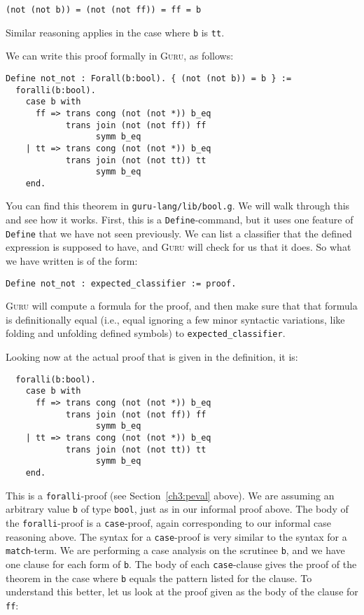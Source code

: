 \documentclass{book}[12pt]
\newcommand{\guru}[0]{\textsc{Guru}\xspace}
\begin{document}
\begin{verbatim}
(not (not b)) = (not (not ff)) = ff = b
\end{verbatim}

\noindent Similar reasoning applies in the case where \texttt{b} is
\texttt{tt}.

We can write this proof formally in \guru, as follows:

\begin{verbatim}
Define not_not : Forall(b:bool). { (not (not b)) = b } :=
  foralli(b:bool).
    case b with
      ff => trans cong (not (not *)) b_eq
            trans join (not (not ff)) ff
                  symm b_eq
    | tt => trans cong (not (not *)) b_eq
            trans join (not (not tt)) tt
                  symm b_eq           
    end.
\end{verbatim}

\noindent You can find this theorem in \texttt{guru-lang/lib/bool.g}.
We will walk through this and see how it works.  First, this is a
\texttt{Define}-command, but it uses one feature of \texttt{Define}
that we have not seen previously.  We can list a classifier that the
defined expression is supposed to have, and \guru will check for us
that it does.  So what we have written is of the form:

\begin{verbatim}
Define not_not : expected_classifier := proof.
\end{verbatim}

\noindent \guru will compute a formula for the proof, and then make
sure that that formula is definitionally equal (i.e., equal ignoring a
few minor syntactic variations, like folding and unfolding defined
symbols) to \texttt{expected\_classifier}.

Looking now at the actual proof that is given in the definition, it
is:

\begin{verbatim}
  foralli(b:bool).
    case b with
      ff => trans cong (not (not *)) b_eq
            trans join (not (not ff)) ff
                  symm b_eq
    | tt => trans cong (not (not *)) b_eq
            trans join (not (not tt)) tt
                  symm b_eq           
    end.
\end{verbatim}

\noindent This is a \texttt{foralli}-proof (see
Section~\ref{ch3:peval} above).  We are assuming an arbitrary value
\texttt{b} of type \texttt{bool}, just as in our informal proof above.
The body of the \texttt{foralli}-proof is a \texttt{case}-proof, again
corresponding to our informal case reasoning above.  The syntax for a
\texttt{case}-proof is very similar to the syntax for a
\texttt{match}-term.  We are performing a case analysis on the
scrutinee \texttt{b}, and we have one clause for each form of
\texttt{b}.  The body of each \texttt{case}-clause gives the proof of
the theorem in the case where \texttt{b} equals the pattern listed for
the clause.  To understand this better, let us look at the proof given
as the body of the clause for \texttt{ff}:
\end{document}
